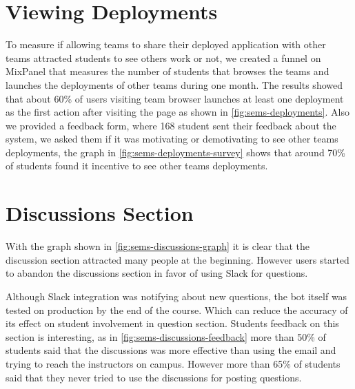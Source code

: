 \section{Viewing Deployments}
\label{sec:deployments-views}
To measure if allowing teams to share their deployed application with other teams attracted students to see others work or not, we created
a funnel on MixPanel\texttrademark{} that measures the number of students that browses the teams and launches the deployments of other teams during
one month. The results showed that about 60\% of users visiting team browser launches at least one deployment as the first action after visiting the
page as shown in \ref{fig:sems-deployments}. Also we provided a feedback form, where 168 student sent their feedback about the system, we
asked them if it was motivating or demotivating to see other teams deployments, the graph in \ref{fig:sems-deployments-survey} shows that around 70\%
of students found it incentive to see other teams deployments.

\section{Discussions Section}
\label{sec:discussions-stats}
With the graph shown in \ref{fig:sems-discussions-graph} it is clear that the discussion section attracted many people at the beginning.
However users started to abandon the discussions section in favor of using Slack\texttrademark{} for questions.

\newParagraph
Although Slack\texttrademark{} integration was notifying about new questions, the bot itself was tested on production by the end
of the course. Which can reduce the accuracy of its effect on student involvement in question section. Students feedback on this
section is interesting, as in \ref{fig:sems-discussions-feedback} more than 50\% of students said that the discussions was more
effective than using the email and trying to reach the instructors on campus. However more than 65\% of students said
that they never tried to use the discussions for posting questions.

